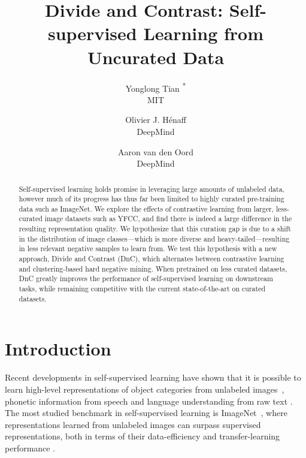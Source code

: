 \documentclass[final]{cvpr}
\begin{document}
\title{Divide and Contrast: Self-supervised Learning from Uncurated Data}

\author{Yonglong Tian
\textsuperscript{*} 
\\
MIT
\and
Olivier J. Hénaff \\
DeepMind
\and
Aaron van den Oord \\ 
DeepMind
}


\maketitle
\let\thefootnote\relax{}


\begin{abstract}


Self-supervised learning holds promise in leveraging large amounts of unlabeled data, however much of its progress has thus far been limited to highly curated pre-training data such as ImageNet. We explore the effects of contrastive learning from larger, less-curated image datasets such as YFCC, and find there is indeed a large difference in the resulting representation quality. We hypothesize that this curation gap is due to a shift in the distribution of image classes---which is more diverse and heavy-tailed---resulting in less relevant negative samples to learn from. We test this hypothesis with a new approach, Divide and Contrast (DnC), which alternates between contrastive learning and clustering-based hard negative mining. When pretrained on less curated datasets, DnC greatly improves the performance of self-supervised learning on downstream tasks, while remaining competitive with the current state-of-the-art on curated datasets.

\end{abstract}
 
\section{Introduction}



Recent developments in self-supervised learning have shown that it is possible to learn high-level representations of object categories from unlabeled images~\cite{he2020momentum, henaff2019data,tian2019contrastive,chen2020simple,wu2018unsupervised}, phonetic information from speech \cite{oord2018representation, schneider2019wav2vec} and language understanding from raw text \cite{devlin2018bert,yang2019xlnet}. The most studied benchmark in self-supervised learning is ImageNet~\cite{deng2009imagenet}, where representations learned from unlabeled images can surpass supervised representations, both in terms of their data-efficiency and transfer-learning performance \cite{chen2020big, grill2020bootstrap}.
\end{document}

